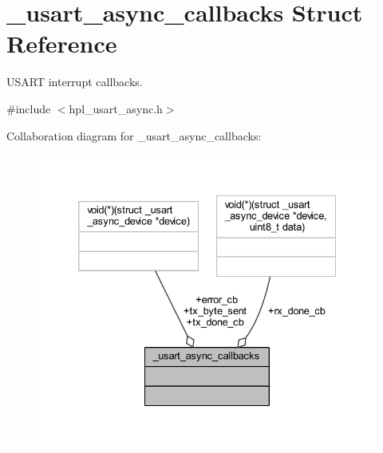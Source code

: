 \hypertarget{struct__usart__async__callbacks}{}\section{\+\_\+usart\+\_\+async\+\_\+callbacks Struct Reference}
\label{struct__usart__async__callbacks}


U\+S\+A\+RT interrupt callbacks.  




{\ttfamily \#include $<$hpl\+\_\+usart\+\_\+async.\+h$>$}



Collaboration diagram for \+\_\+usart\+\_\+async\+\_\+callbacks\+:\nopagebreak
\begin{figure}[H]
\begin{center}
\leavevmode
\includegraphics[width=332pt]{struct__usart__async__callbacks__coll__graph}
\end{center}
\end{figure}
